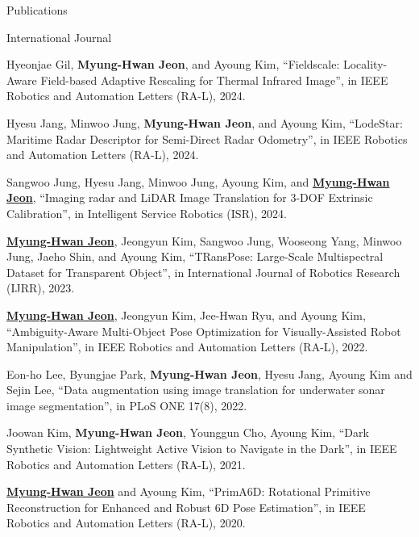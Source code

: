 \begin{rSection}{Publications}



\begin{pubSubsection}{International Journal}

  \item Hyeonjae Gil, \textbf{Myung-Hwan Jeon}, and Ayoung Kim, “Fieldscale: Locality-Aware Field-based Adaptive Rescaling for Thermal Infrared Image”, in IEEE Robotics and Automation Letters (RA-L), 2024.

  \item Hyesu Jang, Minwoo Jung, \textbf{Myung-Hwan Jeon}, and Ayoung Kim, “LodeStar: Maritime Radar Descriptor for Semi-Direct Radar Odometry”, in IEEE Robotics and Automation Letters (RA-L), 2024.
  
  \item Sangwoo Jung, Hyesu Jang, Minwoo Jung, Ayoung Kim, and \underline{\textbf{Myung-Hwan Jeon}}, “Imaging radar and LiDAR Image Translation for 3-DOF Extrinsic Calibration”, in Intelligent Service Robotics (ISR), 2024.

  \item \underline{\textbf{Myung-Hwan Jeon}}, Jeongyun Kim, Sangwoo Jung, Wooseong Yang, Minwoo Jung, Jaeho Shin, and Ayoung Kim, “TRansPose: Large-Scale Multispectral Dataset for Transparent Object”, in International Journal of Robotics Research (IJRR), 2023.

  \item \underline{\textbf{Myung-Hwan Jeon}}, Jeongyun Kim, Jee-Hwan Ryu, and Ayoung Kim, “Ambiguity-Aware Multi-Object Pose Optimization for Visually-Assisted Robot Manipulation”, in IEEE Robotics and Automation Letters (RA-L), 2022.
  
  \item Eon-ho Lee, Byungjae Park, \textbf{Myung-Hwan Jeon}, Hyesu Jang, Ayoung Kim and Sejin Lee, “Data augmentation using image translation for underwater sonar image segmentation”, in PLoS ONE 17(8), 2022.
  
  \item Joowan Kim, \textbf{Myung-Hwan Jeon}, Younggun Cho, Ayoung Kim, “Dark Synthetic Vision: Lightweight Active Vision to Navigate in the Dark”, in IEEE Robotics and Automation Letters (RA-L), 2021.
  
  \item \underline{\textbf{Myung-Hwan Jeon}} and Ayoung Kim, “PrimA6D: Rotational Primitive Reconstruction for Enhanced and Robust 6D Pose Estimation”, in IEEE Robotics and Automation Letters (RA-L), 2020.  


\end{pubSubsection}
\end{rSection}
